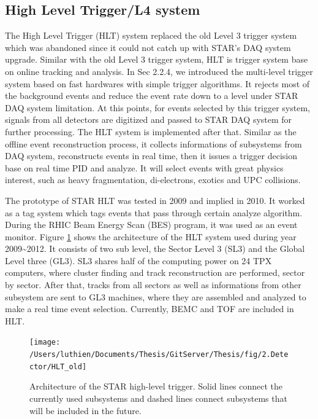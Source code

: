 \subsection{High Level Trigger/L4 system}

The High Level Trigger (HLT) system replaced the old Level 3 trigger
system which was abandoned since it could not catch up with STAR's
DAQ system upgrade. Similar with the old Level 3 trigger system, HLT
is trigger system base on online tracking and analysis. In Sec 2.2.4,
we introduced the multi-level trigger system based on fast hardwares
with simple trigger algorithms. It rejects most of the background
events and reduce the event rate down to a level under STAR DAQ system
limitation. At this points, for events selected by this trigger system,
signals from all detectors are digitized and passed to STAR DAQ system
for further processing. The HLT system is implemented after that.
Similar as the offline event reconstruction process, it collects informations
of subsystems from DAQ system, reconstructs events in real time, then
it issues a trigger decision base on real time PID and analyze. It
will select events with great physics interest, such as heavy fragmentation,
di-electrons, exotics and UPC collisions.

The prototype of STAR HLT was tested in 2009 and implied in 2010.
It worked as a tag system which tags events that pass through certain
analyze algorithm. During the RHIC Beam Energy Scan (BES) program,
it was used as an event monitor. Figure \ref{fig:HLT_old} shows the
architecture of the HLT system used during year 2009\textasciitilde{}2012.
It consists of two sub level, the Sector Level 3 (SL3) and the Global
Level three (GL3). SL3 shares half of the computing power on 24 TPX
computers, where cluster finding and track reconstruction are performed,
sector by sector. After that, tracks from all sectors as well as informations
from other subsystem are sent to GL3 machines, where they are assembled
and analyzed to make a real time event selection. Currently, BEMC
and TOF are included in HLT. 

\begin{figure}
\begin{centering}
\texttt{[image: /Users/luthien/Documents/Thesis/GitServer/Thesis/fig/2.Detector/HLT\_old]}
\par\end{centering}

\protect\caption{Architecture of the STAR high-level trigger. Solid lines connect the
currently used subsystems and dashed lines connect subsystems that
will be included in the future.}


\label{fig:HLT_old}
\end{figure}


